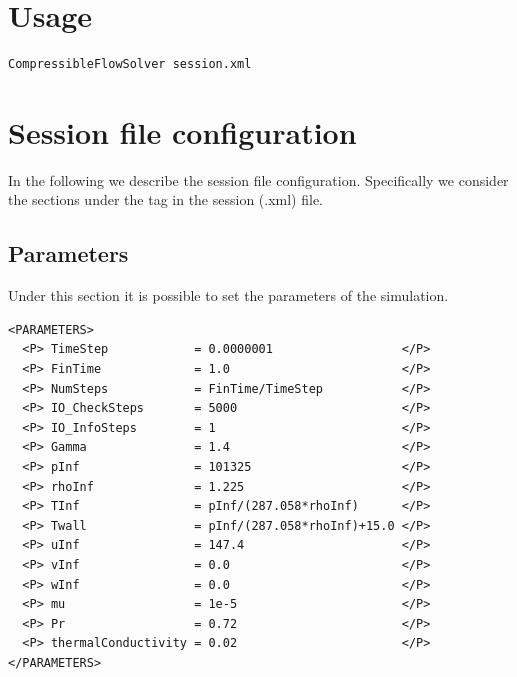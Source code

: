 \section{Usage}
\begin{lstlisting}[style=BashInputStyle]
CompressibleFlowSolver session.xml
\end{lstlisting}


\section{Session file configuration}
In the following we describe the session file configuration. Specifically we consider the
sections under the tag  in the session (.xml) file.
\subsection*{Parameters}
Under this section it is possible to set the parameters of the simulation.
\begin{lstlisting}[style=XmlStyle]
<PARAMETERS>
  <P> TimeStep            = 0.0000001                  </P>
  <P> FinTime             = 1.0                        </P>
  <P> NumSteps            = FinTime/TimeStep           </P>
  <P> IO_CheckSteps       = 5000                       </P>
  <P> IO_InfoSteps        = 1                          </P>
  <P> Gamma               = 1.4                        </P>
  <P> pInf                = 101325                     </P>
  <P> rhoInf              = 1.225                      </P>
  <P> TInf                = pInf/(287.058*rhoInf)      </P>
  <P> Twall               = pInf/(287.058*rhoInf)+15.0 </P>
  <P> uInf                = 147.4                      </P>
  <P> vInf                = 0.0                        </P>
  <P> wInf                = 0.0                        </P>
  <P> mu                  = 1e-5                       </P>
  <P> Pr                  = 0.72                       </P>
  <P> thermalConductivity = 0.02                       </P>
</PARAMETERS>
\end{lstlisting}
